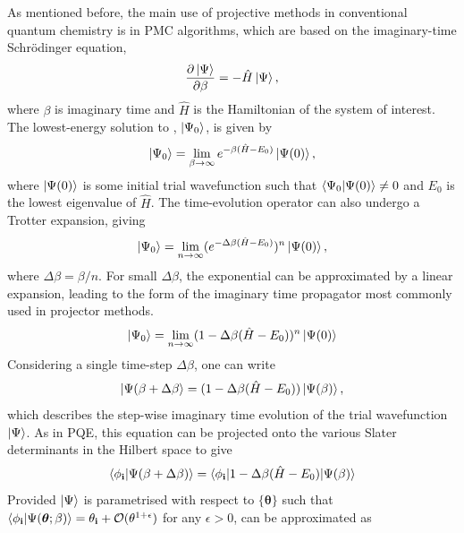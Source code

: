 \documentclass[%
 reprint,
 amsmath,amssymb,
 aps,
]{revtex4-2}
\begin{document}
As mentioned before, the main use of projective methods in conventional quantum chemistry is in PMC algorithms, which are based on the imaginary-time Schr\"odinger equation,
\begin{equation}
    \frac{\partial \ket{\Psi}}{\partial \beta} = - \hat H \ket{\Psi},
    \label{eq:im_sch}
\end{equation}
where $\beta$ is imaginary time and $\hat H$ is the Hamiltonian of the system of interest. The lowest-energy solution to , $\ket{\Psi_0}$, is given by
\begin{equation}
    \ket{\Psi_0} = \lim_{\beta \rightarrow \infty} e^{-\beta (\hat H - E_0)}\ket{\Psi(0)},
\end{equation}
where $\ket{\Psi(0)}$ is some initial trial wavefunction such that $\braket{\Psi_0|\Psi(0)}\neq0$ and $E_0$ is the lowest eigenvalue of $\hat H$. The time-evolution operator can also undergo a Trotter expansion, giving
\begin{equation}
    \ket{\Psi_0} = \lim_{n \rightarrow \infty} (e^{-\Delta \beta (\hat H - E_0)})^n \ket{\Psi(0)},
\end{equation}
where $\Delta \beta = \beta/n$. For small $\Delta \beta$, the exponential can be approximated by a linear expansion, leading to the form of the imaginary time propagator most commonly used in projector methods.
\begin{equation}
    \ket{\Psi_0} = \lim_{n \rightarrow \infty} (1 - \Delta\beta (\hat H - E_0))^n \ket{\Psi(0)}
    \label{eq:proj}
\end{equation}
Considering a single time-step $\Delta \beta$, one can write
\begin{equation}
        \ket{\Psi(\beta + \Delta \beta} = (1 - \Delta\beta (\hat H - E_0)) \ket{\Psi(\beta)},
\end{equation}
which describes the step-wise imaginary time evolution of the trial wavefunction $\ket{\Psi}$. As in PQE, this equation can be projected onto the various Slater determinants in the Hilbert space to give
\begin{equation}
    \braket{\phi_\mathbf{i}|\Psi(\beta + \Delta \beta)} = \braket{\phi_\mathbf{i}|1 - \Delta\beta (\hat H - E_0)|\Psi(\beta)}
    \label{eq:pmc}
\end{equation}
Provided $\ket{\Psi}$ is parametrised with respect to $\{\boldsymbol \theta\}$ such that $\braket{\phi_\mathbf{i}|\Psi(\boldsymbol{\theta};\beta)} = \theta_\mathbf{i} + \mathcal{O}(\theta^{1 + \epsilon})$ for any $\epsilon > 0$,   can be approximated as
\end{document}
